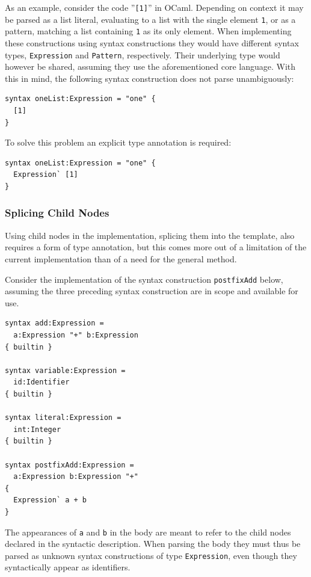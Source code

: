 \documentclass{kththesis}
\begin{document}
As an example, consider the code ''\texttt{[1]}'' in OCaml. Depending on context it may be parsed as a list literal, evaluating to a list with the single element \texttt{1}, or as a pattern, matching a list containing \texttt{1} as its only element. When implementing these constructions using syntax constructions they would have different syntax types, \texttt{Expression} and \texttt{Pattern}, respectively. Their underlying type would however be shared, assuming they use the aforementioned core language. With this in mind, the following syntax construction does not parse unambiguously:

\begin{verbatim}
syntax oneList:Expression = "one" {
  [1]
}
\end{verbatim}

To solve this problem an explicit type annotation is required:

\begin{verbatim}
syntax oneList:Expression = "one" {
  Expression` [1]
}
\end{verbatim}

\subsubsection{Splicing Child Nodes}

Using child nodes in the implementation, splicing them into the template, also requires a form of type annotation, but this comes more out of a limitation of the current implementation than of a need for the general method.

Consider the implementation of the syntax construction \texttt{postfixAdd} below, assuming the three preceding syntax construction are in scope and available for use.

\begin{verbatim}
syntax add:Expression =
  a:Expression "+" b:Expression
{ builtin }

syntax variable:Expression =
  id:Identifier
{ builtin }

syntax literal:Expression =
  int:Integer
{ builtin }

syntax postfixAdd:Expression =
  a:Expression b:Expression "+"
{
  Expression` a + b
}
\end{verbatim}

The appearances of \texttt{a} and \texttt{b} in the body are meant to refer to the child nodes declared in the syntactic description. When parsing the body they must thus be parsed as unknown syntax constructions of type \texttt{Expression}, even though they syntactically appear as identifiers.
\end{document}
